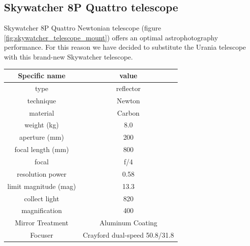 \documentclass{article}
\begin{document}
\begin{multicols}{2}
        \subsection{Skywatcher 8P Quattro telescope}
        Skywatcher 8P Quattro Newtonian telescope (figure \ref{fig:skywatcher_telescope_mount}) offers an optimal astrophotography performance.
        For this reason we have decided to substitute the Urania telescope with this brand-new Skywatcher telescope.
        \\
        \begin{minipage}{0.5\textwidth}
            \centering
            \begin{tabular}{c|c}
                Specific name & value \\
                \hline
                type & reflector \\
                technique & Newton  \\
                material & Carbon  \\
                weight (kg) & 8.0 \\
                aperture (mm) & 200 \\
                focal length (mm) & 800 \\
                focal & f/4 \\
                resolution power & 0.58 \\
                limit magnitude (mag) & 13.3 \\
                collect light & 820 \\
                magnification & 400 \\
                Mirror Treatment & Aluminum Coating \\
                Focuser & Crayford dual-speed 50.8/31.8 \\
                \hline
            \end{tabular}
            \label{tab_skywatcher_quattro}
        \end{minipage}
        \\
        \begin{minipage}{0.5\textwidth}
            \centering

\end{minipage}
\end{multicols}
\end{document}
